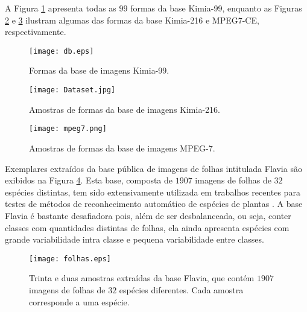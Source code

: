 A Figura \ref{fig:db1} apresenta todas as $99$ formas da base Kimia-99, enquanto as Figuras \ref{fig:db2} e \ref{fig:db3} ilustram algumas das formas da base Kimia-216 e MPEG7-CE, respectivamente.

\begin{figure}[h!]
	\caption{\label{fig:db1} Formas da base de imagens Kimia-99.}
	\centering
	\texttt{[image: db.eps]}
\end{figure}

\begin{figure}[h!]
	\caption{\label{fig:db2} Amostras de formas da base de imagens Kimia-216.}
	\centering
	\texttt{[image: Dataset.jpg]}
\end{figure}

\begin{figure}[h!]
	\caption{\label{fig:db3} Amostras de formas da base de imagens MPEG-7.}
	\centering
	\texttt{[image: mpeg7.png]}
\end{figure}

Exemplares extraídos da base pública de imagens de folhas intitulada Flavia \cite{4458016} são exibidos na Figura \ref{fig:leaves}. Esta base, composta de  $1907$ imagens de folhas de $32$ espécies distintas, tem sido extensivamente utilizada em trabalhos recentes para testes de métodos de reconhecimento automático de espécies de plantas \cite{wang2015march,quteprints78723,Quadri:2015,Chaki201561}. A base Flavia é bastante desafiadora pois, além de ser desbalanceada, ou seja,  conter classes com quantidades distintas de folhas, ela ainda apresenta espécies com grande variabilidade intra classe e pequena variabilidade entre classes.

\begin{figure}[!ht]
	\caption{\label{fig:leaves} Trinta e duas amostras extraídas da base Flavia, que contém $1907$ imagens de folhas de $32$ espécies diferentes. Cada amostra corresponde a uma espécie.}
	\centering
	\texttt{[image: folhas.eps]}
\end{figure}

\begin{comment}
\textcolor{red}{
\section{Extração de características\label{sec:EA}}
Aqui vou comentar os dois métodos de extração de características no qual vou aplicar a metodologia (IDSC e NMBE).
Vou também comentar como será feita a avaliação da 
validade do método proposto (comparação do desempenho com o ajuste de parâmetros obtido através de otimização e valores dos parâmetros sugeridos na literatura.
e por valores propostos na literatura.
}
\end{comment}
